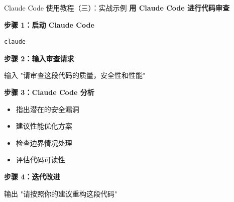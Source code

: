 \begin{frame}[fragile]{Claude Code 使用教程（三）：实战示例}
	\textbf{用 Claude Code 进行代码审查}

	\vspace{0.3cm}

	\textbf{步骤 1：启动 Claude Code}
	\begin{verbatim}
claude
	\end{verbatim}

	\vspace{0.2cm}

	\textbf{步骤 2：输入审查请求}
	\begin{alertblock}{输入}
		"请审查这段代码的质量，安全性和性能"
	\end{alertblock}

	\vspace{0.2cm}

	\textbf{步骤 3：Claude Code 分析}
	\begin{itemize}
		\item 指出潜在的安全漏洞
		\item 建议性能优化方案
		\item 检查边界情况处理
		\item 评估代码可读性
	\end{itemize}

	\vspace{0.2cm}

	\textbf{步骤 4：迭代改进}
	\begin{exampleblock}{输出}
		"请按照你的建议重构这段代码"
	\end{exampleblock}
\end{frame}


